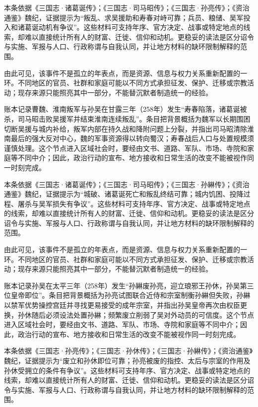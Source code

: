 本条依据《三国志·诸葛诞传》；《三国志·司马昭传》；《三国志·孙亮传》；《资治通鉴》魏纪，证据提示为“叛乱、求吴援助和寿春对峙可靠；兵员、粮储、吴军投入和诸葛诞动机有争议”。这些材料可支持年序、官方决定、战事或特定地点的线索，却难以直接统计所有人的财富、迁徙、信仰和动机。更稳妥的读法是区分诏令与实施、军报与人口、行政称谓与自我认同，并让地方材料的缺环限制解释的范围。

由此可见，该事件不是孤立的年表点，而是资源、信息与权力关系重新配置的一环。不同地区的官员、社群和家庭可能以不同方式承担征发、保护、迁移或宗教活动；现存来源只能照亮其中一部分，不能替沉默者制造统一的经验。

账本记录曹魏、淮南叛军与孙吴在甘露三年（258年）发生“寿春陷落，诸葛诞被杀，司马昭击败吴援军并结束淮南连续叛乱”。条目把背景概括为魏军以长期围困切断吴援与城内补给，叛军内部在持久战和降附问题上分裂，并指出司马昭清除淮南最后的强大反对中心，魏的军事资源得以转向蜀汉；寿春战后人口与处置规模须谨慎处理。这个节点进入区域社会时，要经由文书、道路、军队、市场、寺院和家庭等不同中介；因此，政治行动的宣布、地方接收和日常生活的改变不能被视作同一时刻完成。

本条依据《三国志·诸葛诞传》；《三国志·司马昭传》；《三国志·孙綝传》；《资治通鉴》魏纪，证据提示为“城破、诸葛诞死亡和叛乱终结可靠；城内饥困、投降过程、屠杀与吴军损失有争议”。这些材料可支持年序、官方决定、战事或特定地点的线索，却难以直接统计所有人的财富、迁徙、信仰和动机。更稳妥的读法是区分诏令与实施、军报与人口、行政称谓与自我认同，并让地方材料的缺环限制解释的范围。

由此可见，该事件不是孤立的年表点，而是资源、信息与权力关系重新配置的一环。不同地区的官员、社群和家庭可能以不同方式承担征发、保护、迁移或宗教活动；现存来源只能照亮其中一部分，不能替沉默者制造统一的经验。

账本记录孙吴在太平三年（258年）发生“孙綝废孙亮，迎立琅邪王孙休，孙吴第三位皇帝即位”。条目把背景概括为孙亮试图联合近侍和宗室制衡孙綝但失败，孙綝以禁军优势操控宫廷并寻找更易接受的成年宗室，并指出孙吴皇帝再次由权臣更换，孙休随后必须设法处置孙綝；频繁废立削弱了吴对外动员的可信度。这个节点进入区域社会时，要经由文书、道路、军队、市场、寺院和家庭等不同中介；因此，政治行动的宣布、地方接收和日常生活的改变不能被视作同一时刻完成。

本条依据《三国志·孙亮传》；《三国志·孙休传》；《三国志·孙綝传》；《资治通鉴》魏纪，证据提示为“废立和孙休即位可靠；孙亮被废的指控、太后与宗室的作用及孙休受拥立的条件有争议”。这些材料可支持年序、官方决定、战事或特定地点的线索，却难以直接统计所有人的财富、迁徙、信仰和动机。更稳妥的读法是区分诏令与实施、军报与人口、行政称谓与自我认同，并让地方材料的缺环限制解释的范围。

